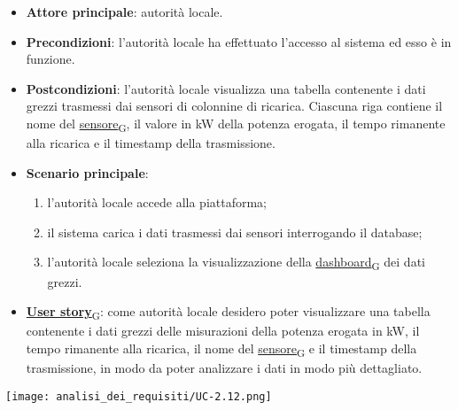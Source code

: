 \begin{itemize}
	\item \textbf{Attore principale}: autorità locale.
	\item \textbf{Precondizioni}: l'autorità locale ha effettuato l'accesso al sistema ed esso è in funzione.
	\item \textbf{Postcondizioni}: l'autorità locale visualizza una tabella contenente i dati grezzi trasmessi dai sensori di colonnine di ricarica.
	      Ciascuna riga contiene il nome del \href{https://7last.github.io/docs/pb/documentazione-interna/glossario\#sensore}{sensore\textsubscript{G}}, il valore in kW della potenza erogata, il tempo rimanente alla ricarica e il timestamp della trasmissione.
	\item \textbf{Scenario principale}:
	      \begin{enumerate}
		      \item l'autorità locale accede alla piattaforma;
		      \item il sistema carica i dati trasmessi dai sensori interrogando il database;
		      \item l'autorità locale seleziona la visualizzazione della \href{https://7last.github.io/docs/pb/documentazione-interna/glossario\#dashboard}{dashboard\textsubscript{G}} dei dati grezzi.
	      \end{enumerate}
	\item \href{https://7last.github.io/docs/pb/documentazione-interna/glossario\#user-story}{\textbf{User story}\textsubscript{G}}:
	      come autorità locale desidero poter visualizzare una tabella contenente i dati grezzi delle misurazioni della potenza erogata in kW,
	      il tempo rimanente alla ricarica, il nome del \href{https://7last.github.io/docs/pb/documentazione-interna/glossario\#sensore}{sensore\textsubscript{G}} e il timestamp della trasmissione, in modo da poter analizzare i dati in modo più dettagliato.
\end{itemize}
\begin{center}
	\texttt{[image: analisi\_dei\_requisiti/UC-2.12.png]}
\end{center}


